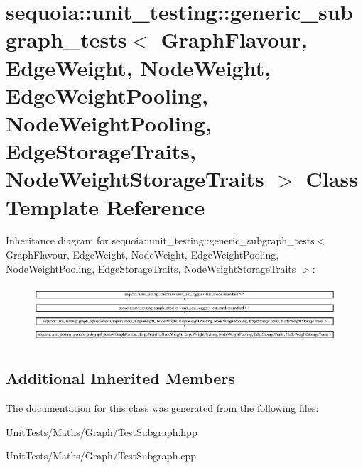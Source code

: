 \hypertarget{classsequoia_1_1unit__testing_1_1generic__subgraph__tests}{}\section{sequoia\+::unit\+\_\+testing\+::generic\+\_\+subgraph\+\_\+tests$<$ Graph\+Flavour, Edge\+Weight, Node\+Weight, Edge\+Weight\+Pooling, Node\+Weight\+Pooling, Edge\+Storage\+Traits, Node\+Weight\+Storage\+Traits $>$ Class Template Reference}
\label{classsequoia_1_1unit__testing_1_1generic__subgraph__tests}
Inheritance diagram for sequoia\+::unit\+\_\+testing\+::generic\+\_\+subgraph\+\_\+tests$<$ Graph\+Flavour, Edge\+Weight, Node\+Weight, Edge\+Weight\+Pooling, Node\+Weight\+Pooling, Edge\+Storage\+Traits, Node\+Weight\+Storage\+Traits $>$\+:\begin{figure}[H]
\begin{center}
\leavevmode
\includegraphics[height=2.172648cm]{classsequoia_1_1unit__testing_1_1generic__subgraph__tests}
\end{center}
\end{figure}
\subsection*{Additional Inherited Members}


The documentation for this class was generated from the following files\+:\begin{DoxyCompactItemize}
\item 
Unit\+Tests/\+Maths/\+Graph/Test\+Subgraph.\+hpp\item 
Unit\+Tests/\+Maths/\+Graph/Test\+Subgraph.\+cpp\end{DoxyCompactItemize}

